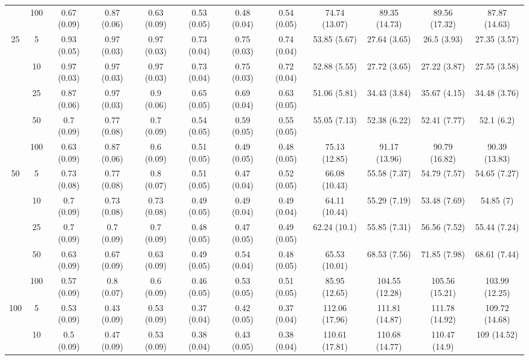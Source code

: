 \documentclass[11pt]{article}
\theoremstyle{definition}
\begin{document}
\begin{table}[H]
\begin{center}
{\begin{tabular}{cc|ccc|ccc|cccc|}
    & 100  & 0.67 (0.09) & 0.87 (0.06) & 0.63 (0.09) & 0.53 (0.05) & 0.48 (0.04) & 0.54 (0.05) & 74.74 (13.07) & 89.35 (14.73) & 89.56 (17.32) & 87.87 (14.63)  \\[.3cm]    
   \multirow{5}{*}{25}  & 5  & 0.93 (0.05) & 0.97 (0.03) & 0.97 (0.03) & 0.73 (0.04) & 0.75 (0.03) & 0.74 (0.04) & 53.85 (5.67) & 27.64 (3.65) & 26.5 (3.93) & 27.35 (3.57) \\ 
    & 10  & 0.97 (0.03) & 0.97 (0.03) & 0.97 (0.03) & 0.73 (0.04) & 0.75 (0.03) & 0.72 (0.04) & 52.88 (5.55) & 27.72 (3.65) & 27.22 (3.87) & 27.55 (3.58) \\ 
    & 25  & 0.87 (0.06) & 0.97 (0.03) & 0.9 (0.06) & 0.65 (0.05) & 0.69 (0.04) & 0.63 (0.05) & 51.06 (5.81) & 34.43 (3.84) & 35.67 (4.15) & 34.48 (3.76) \\ 
    & 50  & 0.7 (0.09) & 0.77 (0.08) & 0.7 (0.09) & 0.54 (0.05) & 0.59 (0.05) & 0.55 (0.05) & 55.05 (7.13) & 52.38 (6.22) & 52.41 (7.77) & 52.1 (6.2) \\ 
    & 100  & 0.63 (0.09) & 0.87 (0.06) & 0.6 (0.09) & 0.51 (0.05) & 0.49 (0.05) & 0.48 (0.05) & 75.13 (12.85) & 91.17 (13.96) & 90.79 (16.82) & 90.39 (13.83)  \\[.3cm] 
   \multirow{5}{*}{50}  & 5  & 0.73 (0.08) & 0.77 (0.08) & 0.8 (0.07) & 0.51 (0.05) & 0.47 (0.04) & 0.52 (0.05) & 66.08 (10.43) & 55.58 (7.37) & 54.79 (7.57) & 54.65 (7.27) \\ 
    & 10  & 0.7 (0.09) & 0.73 (0.08) & 0.73 (0.08) & 0.49 (0.05) & 0.49 (0.04) & 0.49 (0.04) & 64.11 (10.44) & 55.29 (7.19) & 53.48 (7.69) & 54.85 (7) \\ 
    & 25  & 0.7 (0.09) & 0.7 (0.09) & 0.7 (0.09) & 0.48 (0.05) & 0.47 (0.05) & 0.49 (0.05) & 62.24 (10.1) & 55.85 (7.31) & 56.56 (7.52) & 55.44 (7.24) \\ 
    & 50  & 0.63 (0.09) & 0.67 (0.09) & 0.63 (0.09) & 0.49 (0.05) & 0.54 (0.04) & 0.48 (0.05) & 65.53 (10.01) & 68.53 (7.56) & 71.85 (7.98) & 68.61 (7.44) \\ 
    & 100  & 0.57 (0.09) & 0.8 (0.07) & 0.6 (0.09) & 0.46 (0.05) & 0.53 (0.05) & 0.51 (0.05) & 85.95 (12.65) & 104.55 (12.28) & 105.56 (15.21) & 103.99 (12.25)  \\[.3cm] 
   \multirow{5}{*}{100}  & 5  & 0.53 (0.09) & 0.43 (0.09) & 0.53 (0.09) & 0.37 (0.04) & 0.42 (0.05) & 0.37 (0.04) & 112.06 (17.96) & 111.81 (14.87) & 111.78 (14.92) & 109.72 (14.68) \\ 
    & 10  & 0.5 (0.09) & 0.47 (0.09) & 0.53 (0.09) & 0.38 (0.04) & 0.43 (0.05) & 0.38 (0.04) & 110.61 (17.81) & 110.68 (14.77) & 110.47 (14.9) & 109 (14.52) \\ 

\end{tabular}}
\end{center}
\end{table}
\end{document}
